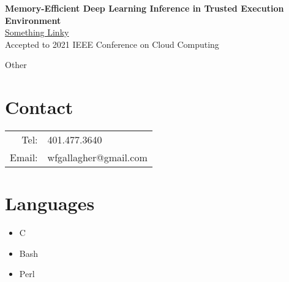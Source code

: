 \documentclass[10pt,a4paper]{article}
\begin{document}
{\begin{tcolorbox}
  \tcblower

  \textbf{Memory-Efficient Deep Learning Inference in Trusted Execution Environment} \\
  \href{http://arxiv-export-lb.library.cornell.edu/abs/2104.15109?context=cs.LG}{Something Linky} \\
  Accepted to 2021 IEEE Conference on Cloud Computing \\
\end{tcolorbox}


\begin{tcolorbox}

  {\selectfont
    \begin{center}
      \LARGE{Other}
    \end{center}
  }

  \tcblower

  \section*{Contact}
  \begin{tabular}{r l}
    Tel: & 401.477.3640 \\
    Email: & wfgallagher@gmail.com \\
  \end{tabular}

  \section*{Languages}
  \begin{itemize}
    \item{C}
    \item{Bash}
    \item{Perl}
  \end{itemize}

\end{tcolorbox}

}
\end{document}
